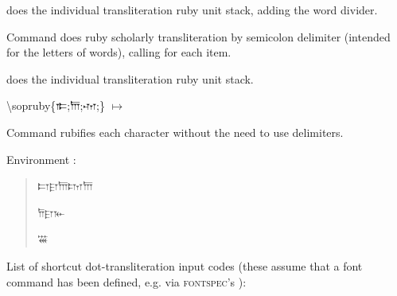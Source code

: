 \documentclass{article}
\begin{document}
\cs{\sopmaprubyw} does the individual transliteration ruby unit stack, adding the word divider.



\bigskip
Command \cs{\sopruby} does ruby scholarly transliteration by semicolon delimiter (intended for the letters of words), calling \cs{\sopmapruby} for each item.

\cs{\sopmapruby} does the individual transliteration ruby unit stack.

{\ttfamily\color{blue}\textbackslash sopruby\{{\opfont\scriptsize 𐎣};{\opfont\scriptsize 𐎠};{\opfont\scriptsize 𐎶};\}}
\enspace$\mapsto$\enspace
{}



\bigskip
Command \cs{\soprubynd} rubifies each character without the need to use delimiters.

\bigskip
{}

Environment :

\begin{quotation}
\begin{soprubynde}
𐎲𐎼𐎠𐎫𐎠

𐎭𐎼𐎹

𐏏
\end{soprubynde}
\end{quotation}

%
List of shortcut dot-transliteration input codes (these assume that a font command \cs{\opfont} has been defined, e.g. via \textsc{fontspec}'s ):
\end{document}
